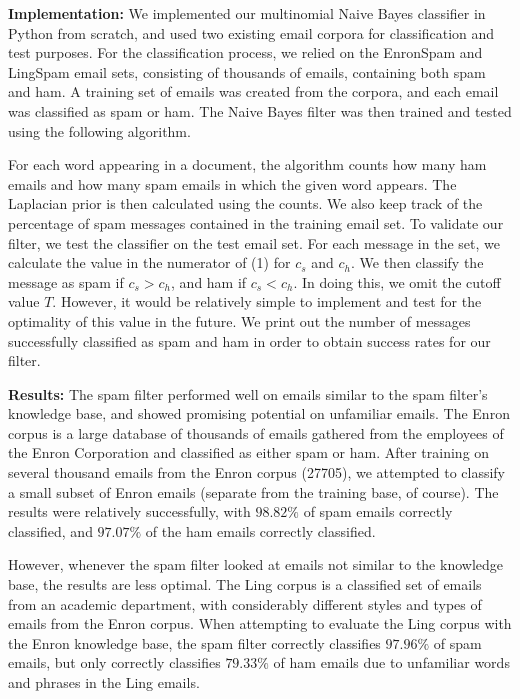 \documentclass[12pt]{article}
\begin{document}
 \textbf{Implementation:}  We implemented our multinomial Naive Bayes classifier in Python from 
 scratch, and used two existing email corpora for classification and test purposes. For the 
 classification process, we relied on the EnronSpam and LingSpam email sets, consisting of 
 thousands of emails, containing both spam and ham.  A training set of emails was created
 from the corpora, and each email was classified as spam or ham.  The Naive Bayes filter was 
 then trained and tested using the following algorithm.
 
 For each word appearing in a document, the algorithm counts how many ham emails and how many
 spam emails in which the given word appears.  The Laplacian prior is then calculated using the 
 counts.  We also keep track of the percentage of spam messages contained in the training email set.
 To validate our filter, we test the classifier on the test email set.  For each message in the set, we
 calculate the value in the numerator of (1) for $c_s$ and $c_h$.  We then classify the message
 as spam if $c_s > c_h$, and ham if $c_s < c_h$.  In doing this, we omit the cutoff value $T$. 
 However, it would be relatively simple to implement and test for the optimality of this value in the future.
 We print out the number of messages successfully classified as spam and ham in order to obtain
 success rates for our filter.
 
 \textbf{Results:}  
 The spam filter performed well on emails similar to the spam filter’s knowledge base, and showed promising potential on unfamiliar emails.  The Enron corpus is a large database of thousands of emails gathered from the employees of the Enron Corporation and classified as either spam or ham.  After training on several thousand emails from the Enron corpus (27705), we attempted to classify a small subset of Enron emails (separate from the training base, of course).  The results were relatively successfully, with $98.82\%$ of spam emails correctly classified, and $97.07\%$ of the ham emails correctly classified.  
 
	However, whenever the spam filter looked at emails not similar to the knowledge base, the results are less optimal.  The Ling corpus is a classified set of emails from an academic department, with considerably different styles and types of emails from the Enron corpus.  When attempting to evaluate the Ling corpus with the Enron knowledge base, the spam filter correctly classifies $97.96\%$ of spam emails, but only correctly classifies $79.33\%$ of ham emails due to unfamiliar words and phrases in the Ling emails.
	
\end{document}
